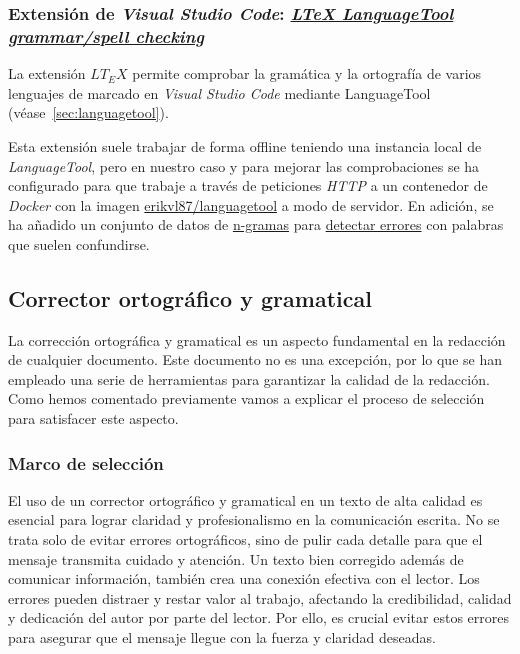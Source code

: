 \subsubsection{Extensión de \textit{Visual Studio Code}: \href{https://github.com/valentjn/vscode-ltex}{\textit{LTeX LanguageTool grammar/spell checking}}}

La extensión \( LT_E X \) permite comprobar la gramática y la ortografía de varios lenguajes de marcado en \textit{Visual Studio Code} mediante LanguageTool (véase~\ref{sec:languagetool}).

Esta extensión suele trabajar de forma offline teniendo una instancia local de \textit{LanguageTool}, pero en nuestro caso y para mejorar las comprobaciones se ha configurado para que trabaje a través de peticiones \textit{HTTP} a un contenedor de \textit{Docker} con la imagen \href{https://hub.docker.com/r/erikvl87/languagetool}{erikvl87/languagetool} a modo de servidor. En adición, se ha añadido un conjunto de datos de \href{https://es.wikipedia.org/wiki/N-grama}{n-gramas} para \href{https://dev.languagetool.org/finding-errors-using-n-gram-data}{detectar errores} con palabras que suelen confundirse.

\subsection{Corrector ortográfico y gramatical}

La corrección ortográfica y gramatical es un aspecto fundamental en la redacción de cualquier documento. Este documento no es una excepción, por lo que se han empleado una serie de herramientas para garantizar la calidad de la redacción. Como hemos comentado previamente vamos a explicar el proceso de selección para satisfacer este aspecto.

\subsubsection{Marco de selección}

El uso de un corrector ortográfico y gramatical en un texto de alta calidad es esencial para lograr claridad y profesionalismo en la comunicación escrita. No se trata solo de evitar errores ortográficos, sino de pulir cada detalle para que el mensaje transmita cuidado y atención. Un texto bien corregido además de comunicar información, también crea una conexión efectiva con el lector. Los errores pueden distraer y restar valor al trabajo, afectando la credibilidad, calidad y dedicación del autor por parte del lector. Por ello, es crucial evitar estos errores para asegurar que el mensaje llegue con la fuerza y claridad deseadas.

